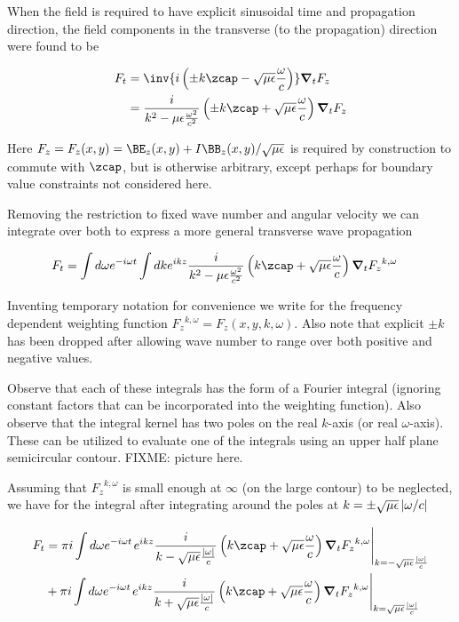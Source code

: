 When the field is required to have explicit sinusoidal time and propagation direction, the field components in the transverse (to the propagation) direction were found to be

\begin{align}\label{eqn:waveguideRetardedAdvanced:foo7}
F_t &= \inv{i \left( \pm k \zcap - \sqrt{\mu\epsilon}\frac{\omega}{c}\right) } \spacegrad_t F_z \\
&= \frac{i}{k^2 - \mu\epsilon\frac{\omega^2}{c^2}} \left( \pm k \zcap + \sqrt{\mu\epsilon}\frac{\omega}{c}\right) \spacegrad_t F_z
\end{align}

Here $F_z = F_z(x,y) = \BE_z(x,y) + I\BB_z(x,y)/\sqrt{\mu\epsilon}$ is required by construction to commute with $\zcap$, but is otherwise arbitrary, except perhaps for boundary value constraints not considered here.

Removing the restriction to fixed wave number and angular velocity we can integrate over both to express a more general transverse wave propagation

\begin{align}\label{eqn:waveguideRetardedAdvanced:foo8}
F_t &= \int d\omega e^{-i\omega t} \int dk e^{ikz} \frac{i}{k^2 - \mu\epsilon\frac{\omega^2}{c^2}} \left(k \zcap + \sqrt{\mu\epsilon}\frac{\omega}{c}\right) \spacegrad_t {F_z}^{k,\omega}
\end{align}

Inventing temporary notation for convenience we write for the frequency dependent weighting function ${F_z}^{k,\omega} = F_z(x,y,k,\omega)$.  Also note that explicit $\pm k$ has been dropped after allowing wave number to range over both positive and negative values.

Observe that each of these integrals has the form of a Fourier integral (ignoring constant factors that can be incorporated into the weighting function).  Also observe that the integral kernel has two poles on the real $k$-axis (or real $\omega$-axis).  These can be utilized to evaluate one of the integrals using an upper half plane semicircular contour.  FIXME: picture here.

Assuming that ${F_z}^{k,\omega}$ is small enough at $\infty$ (on the large contour) to be neglected, we have for the integral after integrating around the poles at $k = \pm \sqrt{\mu\epsilon}\left\lvert{\omega/c}\right\rvert$

\begin{align*} %
F_t 
&= 
\pi i 
\int d\omega e^{-i\omega t} 
{\left.
e^{ikz} \frac{i}{k - \sqrt{\mu\epsilon}\frac{\Abs{\omega}}{c}} \left(k \zcap + \sqrt{\mu\epsilon}\frac{\omega}{c}\right) \spacegrad_t {F_z}^{k,\omega}
\right\vert}_{k=-\sqrt{\mu\epsilon}\frac{\Abs{\omega}}{c}} \\
&+ 
\pi i 
\int d\omega e^{-i\omega t} 
{\left.
e^{ikz} \frac{i}{k + \sqrt{\mu\epsilon}\frac{\Abs{\omega}}{c}} \left(k \zcap + \sqrt{\mu\epsilon}\frac{\omega}{c}\right) \spacegrad_t {F_z}^{k,\omega}
\right\vert}_{k=\sqrt{\mu\epsilon}\frac{\Abs{\omega}}{c}}
\end{align*}

